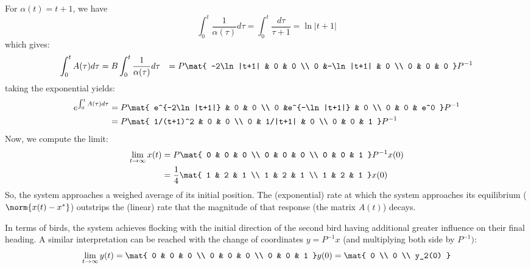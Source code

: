 \documentclass{homework}
\begin{document}
\begin{letterenum}
    \item For $\alpha(t) = t+1$, we have
    \begin{equation}
        \int_{0}^{t}\frac{1}{\alpha(\tau)}d\tau = \int_{0}^{t}\frac{d\tau}{\tau + 1}
            = \ln{|t+1|}
    \end{equation}
    which gives:
    \begin{align*}
        \int_{0}^{t} A(\tau)d\tau &= B \int_{0}^{t}\frac{1}{\alpha(\tau)} d\tau
            &= P \mat{
                -2\ln|t+1| & 0 & 0 \\
                0  &-\ln|t+1| & 0 \\
                0  & 0 & 0
            } P^{-1}
    \end{align*}
    taking the exponential yields:
    \begin{align*}
        e^{\int_{0}^{t}A(\tau)d\tau} &= P \mat{
            e^{-2\ln|t+1|} & 0 & 0 \\
            0  &e^{-\ln|t+1|} & 0 \\
            0  & 0 & e^0
        } P^{-1} \\
        &= P \mat{
            1/(t+1)^2 & 0 & 0 \\
            0  & 1/|t+1| & 0 \\
            0  & 0 & 1
        } P^{-1}
    \end{align*}
    Now, we compute the limit:
    \begin{align*}
        \lim_{t\to\infty} x(t) &= P \mat{
            0 & 0 & 0 \\
            0 & 0 & 0 \\
            0 & 0 & 1
        } P^{-1} x(0) \\
        &= \frac{1}{4} \mat{
            1 & 2 & 1 \\
            1 & 2 & 1 \\
            1 & 2 & 1
        } x(0)
    \end{align*}
    So, the system approaches a weighed average of its initial position. The
    (exponential) rate at which the system approaches its equilibrium ($\norm{x(t) - x^*}$)
    outstrips the (linear) rate that the magnitude of that response (the matrix $A(t)$)
    decays.

    In terms of birds, the system achieves flocking with the initial direction
    of the second bird having additional greater influence on their final heading.
    A similar interpretation can be reached
    with the change of coordinates $y=P^{-1}x$ (and multiplying both side by
    $P^{-1})$:
    \begin{equation}
        \lim_{t\to\infty}y(t) = \mat{
            0 & 0 & 0 \\
            0 & 0 & 0 \\
            0 & 0 & 1
        } y(0) = \mat{
            0 \\ 0 \\ y_2(0)
        }
    \end{equation}
    
    


\end{letterenum}
\end{document}
